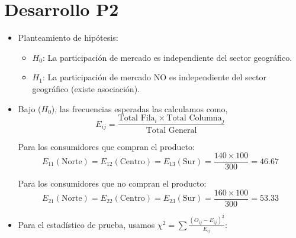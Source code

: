 \documentclass[12pt,a4paper]{article}
\begin{document}
\section*{Desarrollo P2}
\begin{itemize}
    \item [a)] Planteamiento de hipótesis:
    \begin{itemize}
        \item $H_0$: La participación de mercado es independiente del sector geográfico.
        \item $H_1$: La participación de mercado NO es independiente del sector geográfico (existe asociación).
    \end{itemize}

    \item [b)] 
    Bajo ($H_0$), las frecuencias esperadas las calculamos como,
    \begin{equation*}
        E_{ij} = \frac{\text{Total Fila}_i \times \text{Total Columna}_j}{\text{Total General}}
    \end{equation*}
    
    Para los consumidores que compran el producto:
    \begin{equation*}
        E_{11} (\text{Norte}) = E_{12} (\text{Centro}) = E_{13} (\text{Sur}) = \frac{140 \times 100}{300} = 46.67
    \end{equation*}
    
    Para los consumidores que no compran el producto:
    \begin{equation*}
        E_{21} (\text{Norte}) = E_{22} (\text{Centro}) = E_{23} (\text{Sur}) = \frac{160 \times 100}{300} = 53.33
    \end{equation*}
    
    \item [c)]
    Para el estadístico de prueba, usamos $\chi^2 = \sum \frac{(O_{ij} - E_{ij})^2}{E_{ij}}$:
    

\end{itemize}
\end{document}
